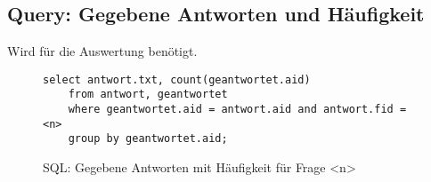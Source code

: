 \subsection{Query: Gegebene Antworten und Häufigkeit}
Wird für die Auswertung benötigt.

\begin{figure}[h]
\begin{verbatim}
select antwort.txt, count(geantwortet.aid) 
	from antwort, geantwortet 
	where geantwortet.aid = antwort.aid and antwort.fid = <n> 
	group by geantwortet.aid;
\end{verbatim}
\caption{SQL: Gegebene Antworten mit Häufigkeit für Frage <n>}
\label{sql:qantwnum}
\end{figure}
